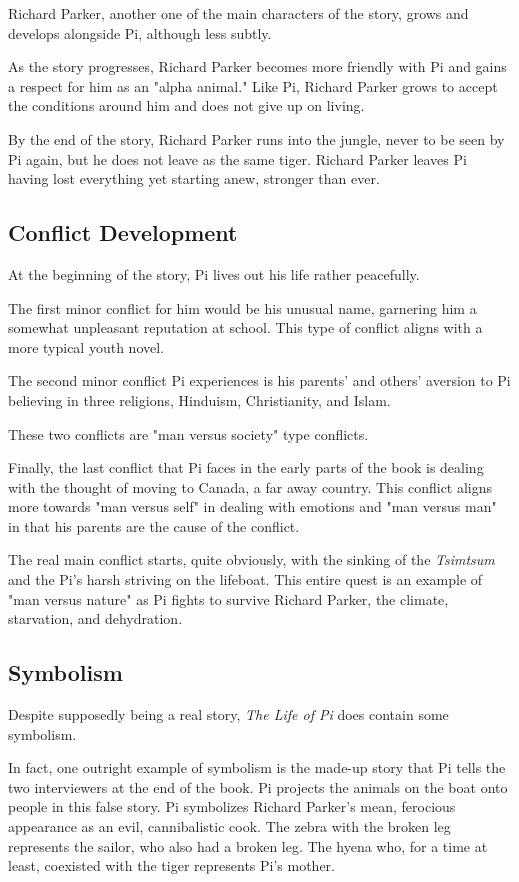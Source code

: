 \documentclass[11pt]{article}
\begin{document}
Richard Parker, another one of the main characters of the story, grows and develops alongside Pi, although less subtly.

As the story progresses, Richard Parker becomes more friendly with Pi and gains a respect for him as an "alpha animal." Like Pi, Richard Parker grows to accept the conditions around him and does not give up on living.

By the end of the story, Richard Parker runs into the jungle, never to be seen by Pi again, but he does not leave as the same tiger. Richard Parker leaves Pi having lost everything yet starting anew, stronger than ever.

\subsection{Conflict Development}
\label{sec:org03e9a92}

At the beginning of the story, Pi lives out his life rather peacefully.

The first minor conflict for him would be his unusual name, garnering him a somewhat unpleasant reputation at school. This type of conflict aligns with a more typical youth novel.

The second minor conflict Pi experiences is his parents' and others' aversion to Pi believing in three religions, Hinduism, Christianity, and Islam.

These two conflicts are "man versus society" type conflicts.

Finally, the last conflict that Pi faces in the early parts of the book is dealing with the thought of moving to Canada, a far away country. This conflict aligns more towards "man versus self" in dealing with emotions and "man versus man" in that his parents are the cause of the conflict.

The real main conflict starts, quite obviously, with the sinking of the \emph{Tsimtsum} and the Pi's harsh striving on the lifeboat. This entire quest is an example of "man versus nature" as Pi fights to survive Richard Parker, the climate, starvation, and dehydration.

\subsection{Symbolism}
\label{sec:orga21cbb4}

Despite supposedly being a real story, \emph{The Life of Pi} does contain some symbolism.

In fact, one outright example of symbolism is the made-up story that Pi tells the two interviewers at the end of the book. Pi projects the animals on the boat onto people in this false story. Pi symbolizes Richard Parker's mean, ferocious appearance as an evil, cannibalistic cook. The zebra with the broken leg represents the sailor, who also had a broken leg. The hyena who, for a time at least, coexisted with the tiger represents Pi's mother.
\end{document}
